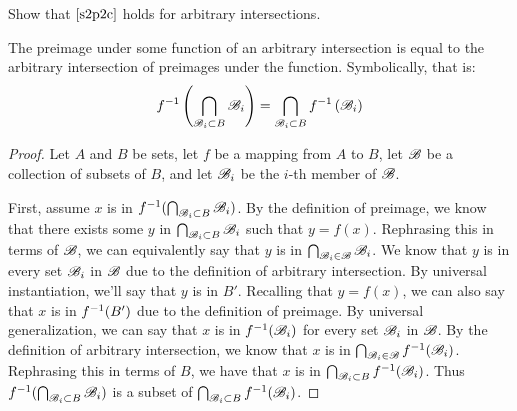 \documentclass[main.tex]{subfiles}
\begin{document}
\subproblem{}\label{s2p3b}

Show that \(\ref{s2p2c}\) holds for arbitrary intersections.

\begin{thm}
	The preimage under some function of an arbitrary intersection is equal
	to the arbitrary intersection of preimages under the function.
	Symbolically, that is:
	\[{f}^{-1}\left(\bigcap\limits_{\mathscr{B}_i \subset B} {\mathscr{B}_i}\right) = \bigcap\limits_{\mathscr{B}_i \subset B} {{f}^{-1}\left(\mathscr{B}_i\right)}\]
\end{thm}
\begin{proof}
	Let \(A\) and \(B\) be sets, let \(f\) be a mapping from \(A\) to \(B\),
	let \(\mathscr{B}\) be a collection of subsets of \(B\), and let
	\(\mathscr{B}_i\) be the \(i\)-th member of \(\mathscr{B}\).

	First, assume \(x\) is in
	\({f}^{-1}(\bigcap_{\mathscr{B}_i \subset B} {\mathscr{B}_i})\).
	By the definition of preimage, we know that there exists some \(y\) in
	\(\bigcap_{\mathscr{B}_i \subset B} {\mathscr{B}_i}\) such
	that \(y = f(x)\). Rephrasing this in terms of \(\mathscr{B}\), we can
	equivalently say that \(y\) is in
	\(\bigcap_{\mathscr{B}_i \in \mathscr{B}} {\mathscr{B}_i}\).
	We know that \(y\) is in every set \(\mathscr{B}_i\) in \(\mathscr{B}\)
	due to the definition of arbitrary intersection. By universal
	instantiation, we'll say that \(y\) is in \(B'\). Recalling that
	\(y = f(x)\), we can also say that \(x\) is in \({f}^{-1}(B')\) due
	to the definition of preimage. By universal generalization, we can say
	that \(x\) is in \({f}^{-1}(\mathscr{B}_i)\) for every set
	\(\mathscr{B}_i\) in \(\mathscr{B}\). By the definition of arbitrary
	intersection, we know that \(x\) is in
	\(\bigcap_{\mathscr{B}_i \in \mathscr{B}} {{f}^{-1}(\mathscr{B}_i)}\).
	Rephrasing this in terms of \(B\), we have that \(x\) is in
	\(\bigcap_{\mathscr{B}_i \subset B} {{f}^{-1}(\mathscr{B}_i)}\).
	Thus
	\({f}^{-1}(\bigcap_{\mathscr{B}_i \subset B} {\mathscr{B}_i})\)
	is a subset of
	\(\bigcap_{\mathscr{B}_i \subset B} {{f}^{-1}(\mathscr{B}_i)}\).


\end{proof}
\end{document}

